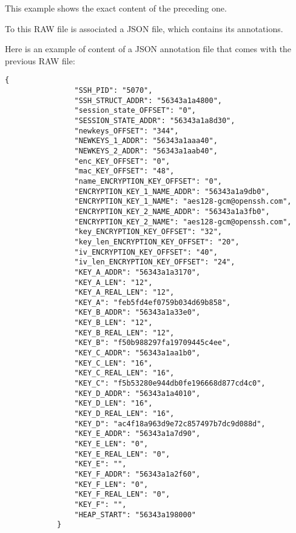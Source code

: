     This example shows the exact content of the preceding one. 

    To this RAW file is associated a JSON file, which contains its annotations.  

    \begin{minipage}{\dimexpr\linewidth-20pt}
         Here is an example of content of a JSON annotation file that comes with the previous RAW file:

        \begin{lstlisting}[style=json, caption={Complete JSON example, from \textit{Training/basic/V\_7\_8\_P1/16/5070-1643978841.json}}, label={lst:json-annotation-ex-1}]
            {
                "SSH_PID": "5070",
                "SSH_STRUCT_ADDR": "56343a1a4800",
                "session_state_OFFSET": "0",
                "SESSION_STATE_ADDR": "56343a1a8d30",
                "newkeys_OFFSET": "344",
                "NEWKEYS_1_ADDR": "56343a1aaa40",
                "NEWKEYS_2_ADDR": "56343a1aab40",
                "enc_KEY_OFFSET": "0",
                "mac_KEY_OFFSET": "48",
                "name_ENCRYPTION_KEY_OFFSET": "0",
                "ENCRYPTION_KEY_1_NAME_ADDR": "56343a1a9db0",
                "ENCRYPTION_KEY_1_NAME": "aes128-gcm@openssh.com",
                "ENCRYPTION_KEY_2_NAME_ADDR": "56343a1a3fb0",
                "ENCRYPTION_KEY_2_NAME": "aes128-gcm@openssh.com",
                "key_ENCRYPTION_KEY_OFFSET": "32",
                "key_len_ENCRYPTION_KEY_OFFSET": "20",
                "iv_ENCRYPTION_KEY_OFFSET": "40",
                "iv_len_ENCRYPTION_KEY_OFFSET": "24",
                "KEY_A_ADDR": "56343a1a3170",
                "KEY_A_LEN": "12",
                "KEY_A_REAL_LEN": "12",
                "KEY_A": "feb5fd4ef0759b034d69b858",
                "KEY_B_ADDR": "56343a1a33e0",
                "KEY_B_LEN": "12",
                "KEY_B_REAL_LEN": "12",
                "KEY_B": "f50b988297fa19709445c4ee",
                "KEY_C_ADDR": "56343a1aa1b0",
                "KEY_C_LEN": "16",
                "KEY_C_REAL_LEN": "16",
                "KEY_C": "f5b53280e944db0fe196668d877cd4c0",
                "KEY_D_ADDR": "56343a1a4010",
                "KEY_D_LEN": "16",
                "KEY_D_REAL_LEN": "16",
                "KEY_D": "ac4f18a963d9e72c857497b7dc9d088d",
                "KEY_E_ADDR": "56343a1a7d90",
                "KEY_E_LEN": "0",
                "KEY_E_REAL_LEN": "0",
                "KEY_E": "",
                "KEY_F_ADDR": "56343a1a2f60",
                "KEY_F_LEN": "0",
                "KEY_F_REAL_LEN": "0",
                "KEY_F": "",
                "HEAP_START": "56343a198000"
            }
        \end{lstlisting}
    \end{minipage}

